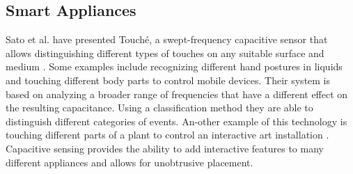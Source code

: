 \subsection{Smart Appliances}
Sato et al. have presented Touché, a swept-frequency capacitive sensor that allows distinguishing different types of touches on any suitable surface and medium \cite{Sato2012}. Some examples include recognizing different hand postures in liquids and touching different body parts to control mobile devices. Their system is based on analyzing a broader range of frequencies that have a different effect on the resulting capacitance. Using a classification method they are able to distinguish different categories of events. An-other example of this technology is touching different parts of a plant to control an interactive art installation  \cite{poupyrev2012botanicus}. Capacitive sensing provides the ability to add interactive features to many different appliances and allows for unobtrusive placement.
